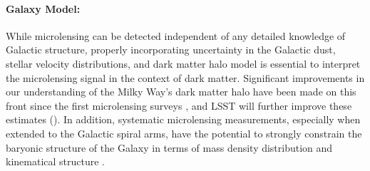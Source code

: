 \paragraph{Galaxy Model:} While microlensing can be detected independent of any detailed knowledge of Galactic structure, properly incorporating uncertainty in the Galactic dust, stellar velocity distributions, and dark matter halo model is essential to interpret the microlensing signal in the context of dark matter.
Significant improvements in our understanding of the Milky Way's dark matter halo have been made on this front since the first microlensing surveys \citep[\eg,][]{Calcino:2018}, and LSST will further improve these estimates ().
In addition, systematic  microlensing measurements, especially when extended to the Galactic spiral arms, have the potential to strongly constrain the baryonic structure of the Galaxy in terms of mass density distribution and kinematical structure \citep[\eg,][]{Moniez:2017}.




